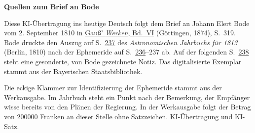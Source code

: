 \clearpage\thispagestyle{empty}
\begin{center}\textbf{Quellen zum Brief an Bode}\end{center}
\noindent Diese KI-Übertragung ins heutige Deutsch folgt dem Brief an Johann Elert Bode vom 2. September 1810 in \href{https://gdz.sub.uni-goettingen.de/id/PPN236007467}{Gauß’ \textit{Werken}, Bd.~VI} (Göttingen, 1874), S.~319. Bode druckte den Auszug auf S.~\href{https://api.digitale-sammlungen.de/iiif/image/v2/bsb10538342_00245/full/1600,/0/default.jpg}{237} des \textit{Astronomischen Jahrbuchs für 1813} (Berlin, 1810) nach der Ephemeride auf S.~\href{https://api.digitale-sammlungen.de/iiif/image/v2/bsb10538342_00244/full/1600,/0/default.jpg}{236}--237 ab. Auf der folgenden S.~\href{https://api.digitale-sammlungen.de/iiif/image/v2/bsb10538342_00246/full/1600,/0/default.jpg}{238} steht eine gesonderte, von Bode gezeichnete Notiz. Das digitalisierte Exemplar stammt aus der Bayerischen Staatsbibliothek.
\par\smallskip\noindent Die eckige Klammer zur Identifizierung der Ephemeride stammt aus der Werkausgabe. Im Jahrbuch steht ein Punkt nach der Bemerkung, der Empfänger wisse bereits von den Plänen der Regierung. In der Werkausgabe folgt der Betrag von 200000 Franken an dieser Stelle ohne Satzzeichen. KI-Übertragung und KI-Satz.
\clearpage
